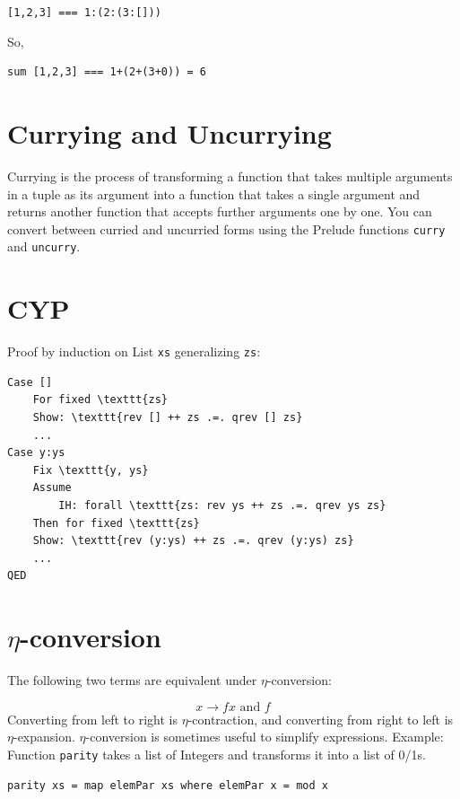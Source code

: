 \documentclass{article}
\begin{document}
\texttt{[1,2,3] === 1:(2:(3:[]))}

So,

\begin{lstlisting}[style=haskellstyle, caption=Haskell Code, label=code:haskell]
sum [1,2,3] === 1+(2+(3+0)) = 6
\end{lstlisting}

\section{Currying and Uncurrying}

Currying is the process of transforming a function that takes multiple arguments in a tuple as its argument into a function that takes a single argument and returns another function that accepts further arguments one by one. You can convert between curried and uncurried forms using the Prelude functions \texttt{curry} and \texttt{uncurry}.

\section{CYP}

Proof by induction on List \texttt{xs} generalizing \texttt{zs}:

\begin{lstlisting}[style=mystyle, caption=Haskell Code, label=code:haskell]
    Case []
    For fixed \texttt{zs}
    Show: \texttt{rev [] ++ zs .=. qrev [] zs}
    ...
Case y:ys
    Fix \texttt{y, ys}
    Assume
        IH: forall \texttt{zs: rev ys ++ zs .=. qrev ys zs}
    Then for fixed \texttt{zs}
    Show: \texttt{rev (y:ys) ++ zs .=. qrev (y:ys) zs}
    ...
QED
\end{lstlisting}

\section{$\eta$-conversion}

The following two terms are equivalent under $\eta$-conversion:

\[
x \rightarrow f x \text{ and } f
\]
Converting from left to right is $\eta$-contraction, and converting from right to left is $\eta$-expansion. $\eta$-conversion is sometimes useful to simplify expressions.
Example:
Function \texttt{parity} takes a list of Integers and transforms it into a list of 0/1s.
\begin{lstlisting}[style=haskellstyle, caption=Haskell Code, label=code:haskell]
parity xs = map elemPar xs where elemPar x = mod x 
\end{lstlisting}
\end{document}
